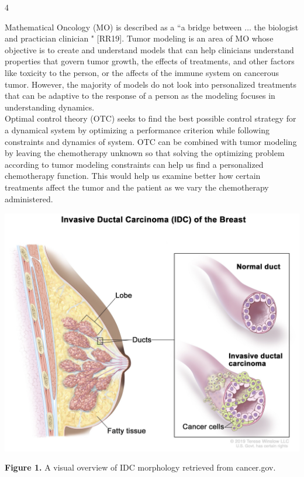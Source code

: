 \documentclass[a0]{4by3}
\newcommand{\NumColumns}{4}
\begin{document}
\color{black}
\noindent
\begin{minipage}{\linewidth + 2\fboxsep}
\begin{multicols*}{\NumColumns}
        \large
        
        \indent Mathematical Oncology (MO) is described as a ``a bridge between $\ldots$ the biologist and practician clinician " [RR19].
        Tumor modeling is an area of MO whose objective is to create and understand models that can help clinicians understand properties that govern tumor growth, the effects of treatments, and other factors like toxicity to the person, or the affects of the immune system on cancerous tumor. 
        However, the majority of models do not look into personalized treatments that can be adaptive to the response of a person as the modeling focuses in understanding dynamics.\\
        
        \indent Optimal control theory (OTC) seeks to find the best possible control strategy for a dynamical system by optimizing a performance criterion while following constraints and dynamics of system.
        OTC can be combined with tumor modeling by leaving the chemotherapy unknown so that solving the optimizing problem according to tumor modeling constraints can help us find a personalized chemotherapy function.
        This would help us examine better how certain treatments affect the tumor and the patient as we vary the chemotherapy administered. 
    \vspace{-17mm}
    
            \large 
            
             \includegraphics[width=1\linewidth,trim={0 1.5cm 0 4.25cm},clip]{./imgs/idc}
  \begin{center}
          {\small \textbf{Figure 1.} A visual overview of IDC morphology retrieved from cancer.gov.}
   \end{center}
            

\end{multicols*}
\end{minipage}
\end{document}
